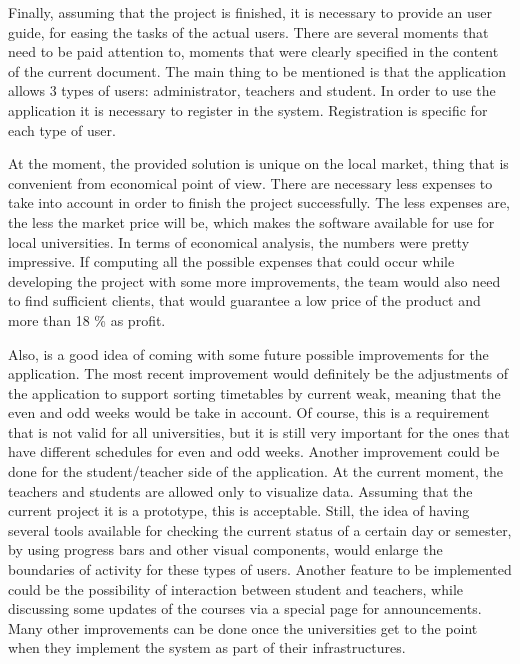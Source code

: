 Finally, assuming that the project is finished, it is necessary to provide an user guide, for easing the tasks of the actual users. There are several moments that need to be paid attention to, moments that were clearly specified in the content of the current document. The main thing to be mentioned is that the application allows 3 types of users: administrator, teachers and student. In order to use the application it is necessary to register in the system. Registration is specific for each type of user. 

At the moment, the provided solution is unique on the local market, thing that is convenient from economical point of view. There are necessary less expenses to take into account in order to finish the project successfully. The less expenses are, the less the market price will be, which makes the software available for use for local universities. In terms of economical analysis, the numbers were pretty impressive. If computing all the possible expenses that could occur while developing the project with some more improvements, the team would also need to find sufficient clients, that would guarantee a low price of the product and more than 18 \% as profit.

Also, is a good idea of coming with some future possible improvements for the application. The most recent improvement would definitely be the adjustments of the application to support sorting timetables by current weak, meaning that the even and odd weeks would be take in account. Of course, this is a requirement that is not valid for all universities, but it is still very important for the ones that have different schedules for even and odd weeks. Another improvement could be done for the student/teacher side of the application. At the current moment, the teachers and students are allowed only to visualize data. Assuming that the current project it is a prototype, this is acceptable. Still, the idea of having several tools available for checking the current status of a certain day or semester, by using progress bars and other visual components, would enlarge the boundaries of activity for these types of users. Another feature to be implemented could be the possibility of interaction between student and teachers, while discussing some updates of the courses via a special page for announcements. Many other improvements can be done once the universities get to the point when they implement the system as part of their infrastructures. 

\clearpage